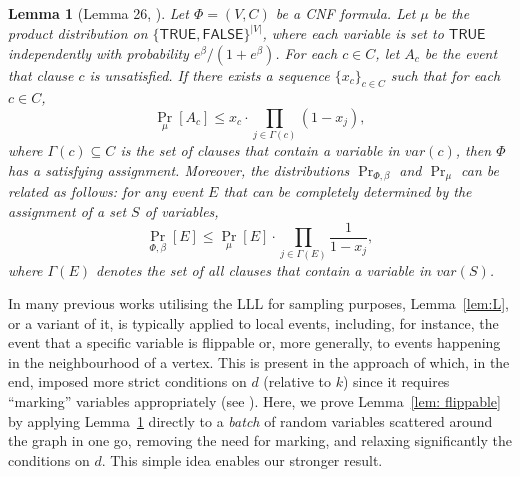 \documentclass[11pt]{article}
\newtheorem{lemma}[theorem]{Lemma}
\theoremstyle{definition}
\theoremstyle{remark}
\def\TRUE{\mathsf{TRUE}}
\def\FALSE{\mathsf{FALSE}}
\begin{document}
\begin{lemma}[Lemma 26, \cite{GJL19}]
\label{lem:LLL GJL19}\label{lem:L}
    Let $\Phi=(V,C)$ be a CNF formula.
    Let $\mu$ be the product distribution on $\{\TRUE,\FALSE\}^{|V|}$, where each variable is set to $\TRUE$ independently with probability $e^\beta/(1+e^\beta)$.
    For each $c \in C$, let $A_c$ be the event that clause $c$ is unsatisfied.
    If there exists a sequence $\{x_c\}_{c\in C}$ such that 
    for each $c \in C$,
    \begin{equation}
        \label{eq:LLL condition}
        \Pr_\mu[A_c] \le x_c \cdot \prod_{j\in \Gamma(c)} (1 - x_j), 
    \end{equation}
    where $\Gamma(c) \subseteq C$ is the set of clauses that contain a variable in $var(c)$, then $\Phi$ has a satisfying assignment. 
    Moreover, the distributions $\Pr_{\Phi, \beta}$ and $\Pr_\mu$ can be related as follows: for any event $E$ that can be completely determined by the assignment of a set $S$ of variables, 
    \begin{equation}
        \label{eq: LLL translation}
        \Pr_{\Phi, \beta}[E] \le \Pr_\mu[E] \cdot \prod_{j \in \Gamma(E)} \frac{1}{1 - x_j},
    \end{equation}
    where $\Gamma(E)$ denotes the set of all clauses that contain a variable in $var(S)$.
\end{lemma}
In many previous works utilising the LLL for sampling purposes, Lemma~\ref{lem:L}, or a variant of it, is typically applied to  local events, including, for instance, the event that a specific variable  is flippable or, more generally, to events happening in the neighbourhood of a vertex. This is present in the approach of \cite{GKK24} which, in the end, imposed more strict conditions on $d$ (relative to $k$) since it requires ``marking'' variables appropriately (see \cite{Moitra19}).
Here, we prove Lemma~\ref{lem: flippable} by applying Lemma~\ref{lem:LLL GJL19} directly to a \emph{batch} of random variables scattered around the graph in one go, removing the need for marking, and relaxing significantly the conditions on $d$. This simple idea enables our stronger result.
\end{document}
